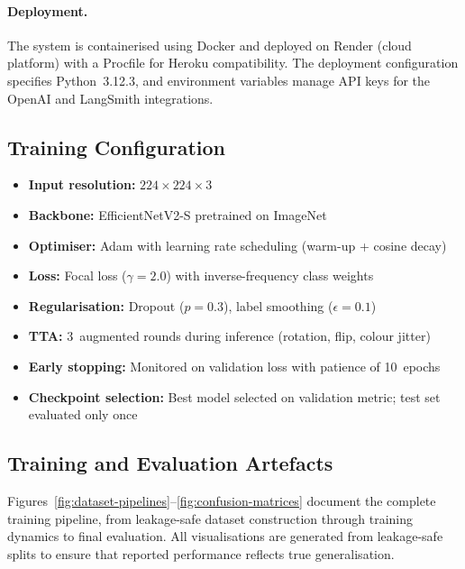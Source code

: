\documentclass[12pt,a4paper]{report}
\begin{document}
\paragraph{Deployment.}
The system is containerised using Docker and deployed on Render (cloud platform) with a Procfile for Heroku compatibility. The deployment configuration specifies Python~3.12.3, and environment variables manage API keys for the OpenAI and LangSmith integrations.

\subsection{Training Configuration}
\begin{itemize}
    \item \textbf{Input resolution:} $224 \times 224 \times 3$
    \item \textbf{Backbone:} EfficientNetV2-S pretrained on ImageNet
    \item \textbf{Optimiser:} Adam with learning rate scheduling (warm-up + cosine decay)
    \item \textbf{Loss:} Focal loss ($\gamma = 2.0$) with inverse-frequency class weights
    \item \textbf{Regularisation:} Dropout ($p = 0.3$), label smoothing ($\epsilon = 0.1$)
    \item \textbf{TTA:} 3~augmented rounds during inference (rotation, flip, colour jitter)
    \item \textbf{Early stopping:} Monitored on validation loss with patience of 10~epochs
    \item \textbf{Checkpoint selection:} Best model selected on validation metric; test set evaluated only once
\end{itemize}

\subsection{Training and Evaluation Artefacts}
Figures~\ref{fig:dataset-pipelines}--\ref{fig:confusion-matrices} document the complete training pipeline, from leakage-safe dataset construction through training dynamics to final evaluation. All visualisations are generated from leakage-safe splits to ensure that reported performance reflects true generalisation.
\end{document}
